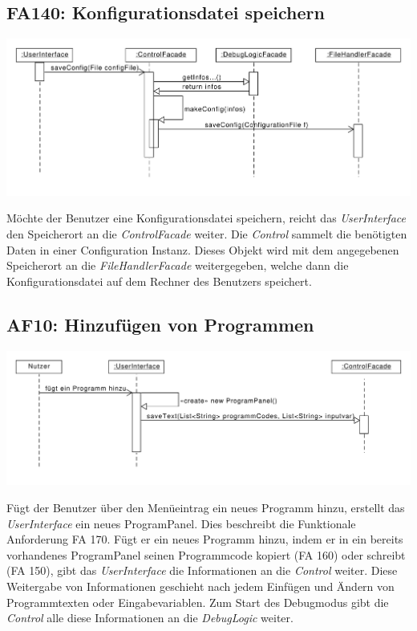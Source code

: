 \documentclass[parskip=full]{scrartcl}
\begin{document}
\subsection{FA140: Konfigurationsdatei speichern}
\begin{center}
\includegraphics[width=1.0\textwidth]{diagrammIdeenUmlet/SequenceDiagrams/seq_saveConfigPDF.pdf}
\end{center}
Möchte der Benutzer eine Konfigurationsdatei speichern, reicht das \textit{UserInterface} den Speicherort an die \textit{ControlFacade} weiter. 
Die \textit{Control} sammelt die benötigten Daten in einer Configuration Instanz.
Dieses Objekt wird mit dem angegebenen Speicherort an die \textit{FileHandlerFacade} weitergegeben, welche dann die Konfigurationsdatei auf dem Rechner des Benutzers speichert.

\newpage
\subsection{AF10: Hinzufügen von Programmen}
\begin{center}
\includegraphics[width=1.0\textwidth]{diagrammIdeenUmlet/SequenceDiagrams/seq_AF10PDF.pdf}
\end{center}
Fügt der Benutzer über den Menüeintrag ein neues Programm hinzu, erstellt das \textit{UserInterface} ein neues ProgramPanel. 
Dies beschreibt die Funktionale Anforderung FA 170.
Fügt er ein neues Programm hinzu, indem er in ein bereits vorhandenes ProgramPanel seinen Programmcode kopiert (FA 160) oder schreibt (FA 150), gibt das \textit{UserInterface} die Informationen an die \textit{Control} weiter.
Diese Weitergabe von Informationen geschieht nach jedem Einfügen und Ändern von Programmtexten oder Eingabevariablen. Zum Start des Debugmodus gibt die \textit{Control} alle diese Informationen an die \textit{DebugLogic} weiter.
\end{document}
